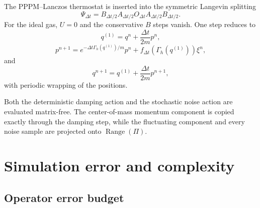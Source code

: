 \documentclass[11pt]{article}
\theoremstyle{plain}
\DeclareRobustCommand{\_}{\textunderscore\allowbreak}
\begin{document}
The PPPM--Lanczos thermostat is inserted into the symmetric Langevin splitting
\begin{equation}
\Psi_{\Delta t}
=
B_{\Delta t/2}A_{\Delta t/2}O_{\Delta t}A_{\Delta t/2}B_{\Delta t/2}.
\end{equation}
For the ideal gas, $U=0$ and the conservative $B$ steps vanish. One step reduces to
\begin{equation}
q^{(1)}
=
q^n+\frac{\Delta t}{2m}p^n,
\end{equation}
\begin{equation}
p^{n+1}
=
e^{-\Delta t\Gamma_h(q^{(1)})/m}p^n
+
f_{\Delta t}(\Gamma_h(q^{(1)}))\xi^n,
\end{equation}
and
\begin{equation}
q^{n+1}
=
q^{(1)}+\frac{\Delta t}{2m}p^{n+1},
\end{equation}
with periodic wrapping of the positions.

Both the deterministic damping action and the stochastic noise action are evaluated matrix-free. The center-of-mass momentum component is copied exactly through the damping step, while the fluctuating component and every noise sample are projected onto $\operatorname{Range}(\Pi)$.

\section{Simulation error and complexity}
\label{sec:error}

\subsection{Operator error budget}
\end{document}
